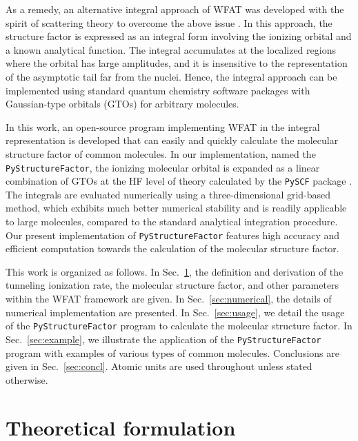 \documentclass[preprint,12pt]{elsarticle} %
\begin{document}
As a remedy, an alternative integral approach of WFAT was developed with the spirit of scattering theory to overcome the above issue \cite{dnestryan_structure_2018, samygin_weak-field_2018}. In this approach, the structure factor is expressed as an integral form involving the ionizing orbital and a known analytical function. The integral accumulates at the localized regions where the orbital has large amplitudes, and it is insensitive to the representation of the asymptotic tail far from the nuclei. Hence, the integral approach can be implemented using standard quantum chemistry software packages with Gaussian-type orbitals (GTOs) for arbitrary molecules.

In this work, an open-source program implementing WFAT in the integral representation is developed that can easily and quickly calculate the molecular structure factor of common molecules. In our implementation, named the \texttt{PyStructureFactor}, the ionizing molecular orbital is expanded as a linear combination of GTOs at the HF level of theory calculated by the \texttt{PySCF} package \cite{sun_pyscf_2018, sun_recent_2020}. The integrals are evaluated numerically using a three-dimensional grid-based method, which exhibits much better numerical stability and is readily applicable to large molecules, compared to the standard analytical integration procedure. Our present implementation of \texttt{PyStructureFactor} features high accuracy and efficient computation towards the calculation of the molecular structure factor.

This work is organized as follows. In Sec.~\ref{sec:theory}, the definition and derivation of the tunneling ionization rate, the molecular structure factor, and other parameters within the WFAT framework are given. In Sec.~\ref{sec:numerical}, the details of numerical implementation are presented. In Sec.~\ref{sec:usage}, we detail the usage of the \texttt{PyStructureFactor} program to calculate the molecular structure factor. In Sec.~\ref{sec:example}, we illustrate the application of the \texttt{PyStructureFactor} program with examples of various types of common molecules. Conclusions are given in Sec.~\ref{sec:concl}. Atomic units are used throughout unless stated otherwise.


\section{Theoretical formulation}
\label{sec:theory}
\end{document}
